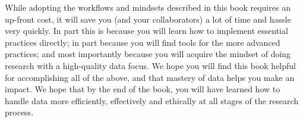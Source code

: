 While adopting the workflows and mindsets described in this book requires an up-front cost,
it will save you (and your collaborators) a lot of time and hassle very quickly.
In part this is because you will learn how to implement essential practices directly;
in part because you will find tools for the more advanced practices;
and most importantly because you will acquire the mindset of doing research with a high-quality data focus.
We hope you will find this book helpful for accomplishing all of the above,
and that mastery of data helps you make an impact.
We hope that by the end of the book,
you will have learned how to handle data more efficiently, effectively and ethically
at all stages of the research process.

\mainmatter
